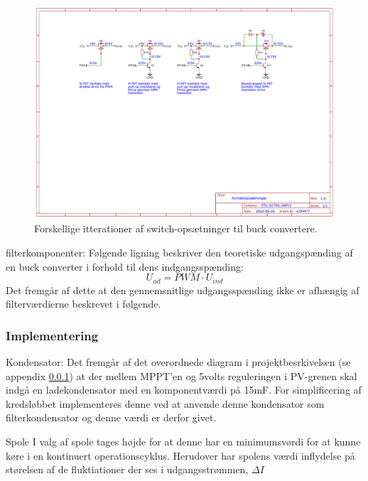 \documentclass[../main.tex]{subfiles}
\begin{document}
            \begin{figure}[H]
            \includegraphics[width=\textwidth]{Dokumentation/Figures/PV_Converter switches.png}
            \caption{Forskellige itterationer af switch-opsætninger til buck convertere.}
            \label{fig: Switch designs}
            \end{figure}
            
            filterkomponenter:
                Følgende ligning beskriver den teoretiske udgangspænding af en buck converter i forhold til dens indgangsspænding:\newline
                $$U_{ud} = PWM \cdot U_{ind} $$\newline
                Det fremgår af dette at den gennemsnitlige udgangsspænding ikke er afhængig af filterværdierne beskrevet i følgende.
            
        \subsubsection{Implementering}

            Kondensator:
            Det fremgår af det overordnede diagram i projektbesrkivelsen (se appendix \ref{}) at der mellem MPPT'en og 5volts reguleringen i PV-grenen skal indgå en ladekondensator med en komponentværdi på 15mF. For simplificering af kredsløbbet implementeres denne ved at anvende denne kondensator som filterkondensator og denne værdi er derfor givet.
            
            Spole
            I valg af spole tages højde for at denne har en minimumsvørdi for at kunne køre i en kontinuert operationscyklus. Herudover har spolens værdi inflydelse på størelsen af de fluktiationer der ses i udgangsstrømmen, $\Delta I$
            
\end{document}
